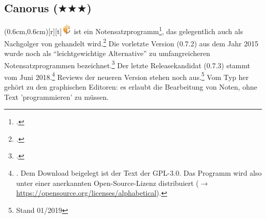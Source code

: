 %
%
%



\subsection{Canorus ($\bigstar\bigstar\bigstar$)}

\parpic(0.6cm,0.6cm)[r][t]{\includegraphics[width=0.5cm]{logos/canorus-300dpi.png}}
\label{Canorus} ist ein Notensatzprogramm\footcite[vgl.][\nopage
wp]{Canorus2019a}, das gelegentlich auch als Nachgolger von 
gehandelt wird.\footcite[vgl.][\nopage wp]{WpedCanorus2019a} Die vorletzte
Version (0.7.2) aus dem Jahr 2015 wurde noch als \enquote{leichtgewichtige
Alternative} zu umfangreicheren Notensatzprogrammen
bezeichnet.\footcite[vgl.][\nopage wp]{Kreussel2015a} Der letzte Releasekandidat
(0.7.3) stammt vom Juni 2018.\footnote{\cite[vgl.][\nopage wp]{Canorus2019b}.
Dem Download beigelegt ist der Text der GPL-3.0. Das Programm wird also unter
einer anerkannten Open-Source-Lizenz distribuiert ($\rightarrow$
\href{https://opensource.org/licenses/alphabetical}
{https://opensource.org/licenses/alphabetical}). } Reviews der neueren Version
stehen noch aus.\footnote{Stand 01/2019} Vom Typ her gehört  zu den
graphischen Editoren: es erlaubt die Bearbeitung von Noten, ohne Text
'programmieren' zu müssen.

